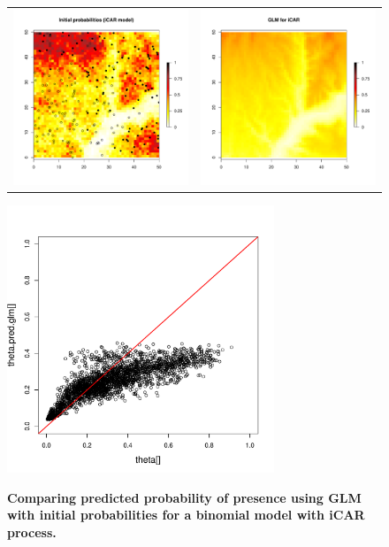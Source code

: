 \documentclass[a4paper, 12pt, leqno]{article}\usepackage[]{graphicx}\usepackage[]{color}
\begin{document}
\begin{figure} 
  \begin{tabular}{cc}
    \includegraphics[width=6.5cm]{figures/binom-iCAR-plots2.pdf} &
    \includegraphics[width=6.5cm]{figures/predictions-binom-iCAR-glm.pdf} \\
  \end{tabular}
  \centering \includegraphics[width=8cm]{figures/pred-obs-binom-iCAR-glm.pdf} \\
  
  \caption{\textbf{Comparing predicted probability of presence using GLM with initial
      probabilities for a binomial model with iCAR process.}}
  
  \label{fig:predictions-siteocc-glm}
  
\end{figure}
\end{document}
